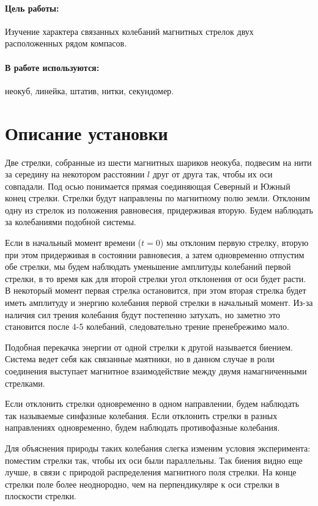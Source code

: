 \documentclass{letask}
\begin{document}


\paragraph{Цель работы:} Изучение характера связанных колебаний магнитных стрелок двух расположенных рядом компасов.

\paragraph{В работе используются:} неокуб, линейка, штатив, нитки, секундомер.

\section{Описание установки}  

Две стрелки, собранные из шести магнитных шариков неокуба, подвесим на нити за середину на некотором расстоянии $l$ друг от друга так, чтобы их оси совпадали. Под осью понимается прямая соединяющая Северный и Южный конец стрелки. Стрелки будут направлены по магнитному полю земли. Отклоним одну из стрелок из положения равновесия, придерживая вторую. Будем наблюдать за колебаниями подобной системы. 

Если в начальный момент времени ($t = 0$) мы отклоним первую стрелку, вторую при этом придерживая в состоянии равновесия, а затем одновременно отпустим обе стрелки, мы будем наблюдать уменьшение амплитуды колебаний первой стрелки, в то время как для второй стрелки угол отклонения от оси будет расти. В некоторый момент первая стрелка остановится, при этом вторая стрелка будет иметь амплитуду и энергию колебания первой стрелки в начальный момент. Из-за наличия сил трения колебания будут постепенно затухать, но заметно это становится после 4-5 колебаний, следовательно трение пренебрежимо мало.

Подобная перекачка энергии от одной стрелки к другой называется биением. Система ведет себя как связанные маятники, но в данном случае в роли соединения выступает магнитное взаимодействие между двумя намагниченными стрелками. 

Если отклонить стрелки одновременно в одном направлении, будем наблюдать так называемые синфазные колебания. 
Если отклонить стрелки в разных направлениях одновременно, будем наблюдать противофазные колебания. 

Для объяснения природы таких колебания слегка изменим условия эксперимента: поместим стрелки так, чтобы их оси были параллельны. Так биения видно еще лучше, в связи с природой распределения магнитного поля стрелки. На конце стрелки поле более неоднородно, чем на перпендикуляре к оси стрелки в плоскости стрелки.
\end{document}
